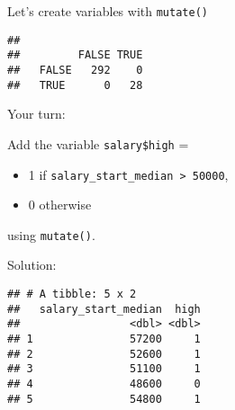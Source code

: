 \documentclass[ignorenonframetext,]{beamer}
\newenvironment{Shaded}{\begin{snugshade}}{\end{snugshade}}
\newcommand{\KeywordTok}[1]{\textcolor[rgb]{0.13,0.29,0.53}{\textbf{#1}}}
\newcommand{\DataTypeTok}[1]{\textcolor[rgb]{0.13,0.29,0.53}{#1}}
\newcommand{\DecValTok}[1]{\textcolor[rgb]{0.00,0.00,0.81}{#1}}
\newcommand{\StringTok}[1]{\textcolor[rgb]{0.31,0.60,0.02}{#1}}
\newcommand{\CommentTok}[1]{\textcolor[rgb]{0.56,0.35,0.01}{\textit{#1}}}
\newcommand{\OperatorTok}[1]{\textcolor[rgb]{0.81,0.36,0.00}{\textbf{#1}}}
\newcommand{\NormalTok}[1]{#1}
\providecommand{\tightlist}{%
	\setlength{\itemsep}{0pt}\setlength{\parskip}{0pt}}
\begin{document}
\begin{frame}[fragile]{Let's create variables with \texttt{mutate()}}

\begin{Shaded}
\end{Shaded}

\begin{verbatim}
##        
##         FALSE TRUE
##   FALSE   292    0
##   TRUE      0   28
\end{verbatim}

\end{frame}

\begin{frame}[fragile]{Your turn:}

Add the variable \texttt{salary\$high} =

\begin{itemize}
\tightlist
\item
  1 if \texttt{salary\_start\_median\ \textgreater{}\ 50000},
\item
  0 otherwise
\end{itemize}

using \texttt{mutate()}.

\end{frame}

\begin{frame}[fragile]{Solution:}

\begin{Shaded}
\end{Shaded}

\begin{verbatim}
## # A tibble: 5 x 2
##   salary_start_median  high
##                 <dbl> <dbl>
## 1               57200     1
## 2               52600     1
## 3               51100     1
## 4               48600     0
## 5               54800     1
\end{verbatim}

\end{frame}
\end{document}

